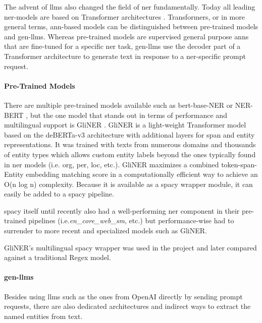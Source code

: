The advent of \glspl{llm} also changed the field of \gls{ner} fundamentally.
Today all leading \gls{ner}-models are based on \gls{Transformer} architectures \cite{leaderboard-ner}.
\glspl{Transformer}, or in more general terms, \gls{ann}-based models can be distinguished between pre-trained models and \glspl{gen-llm}.
Whereas pre-trained models are supervised general purpose \glspl{ann} that are fine-tuned for a specific \gls{ner} task,
\glspl{gen-llm} use the decoder part of a \gls{Transformer} architecture to generate text in response to a \gls{ner}-specific \gls{prompt} request.

\paragraph{Pre-Trained Models}
There are multiple pre-trained models available such as bert-base-NER \cite{bertbaseNER} or NER-BERT \cite{nerbert}, but the one model that stands out in terms of performance and multilingual support is GliNER \cite{gliner}.
GliNER is a light-weight \gls{Transformer} model based on the deBERTa-v3 \cite{deberta} architecture with additional layers for \gls{span} and entity representations.
It was trained with texts from numerous domains and thousands of entity types \cite{gliner} which allows custom entity labels beyond the ones typically found in \gls{ner} models (i.e. \gls{org}, \gls{per}, \gls{loc}, etc.).
GliNER maximizes a combined \gls{token}-\gls{span}-Entity embedding matching score in a computationally efficient way to achieve an O(n log n) complexity.
Because it is available as a spacy wrapper module, it can easily be added to a spacy pipeline.

spacy itself until recently also had a well-performing \gls{ner} component in their pre-trained pipelines (i.e.\emph{en\_core\_web\_sm}, etc.) but performance-wise had to surrender to more recent and specialized models such as GliNER.

GliNER’s multilingual spacy wrapper was used in the project and later compared against a traditional \gls{Regex} model.

\paragraph{\glspl{gen-llm}}\label{par:gpt-ner}
Besides using \glspl{llm} such as the ones from OpenAI directly by sending \gls{prompt} requests, there are also dedicated architectures and indirect ways to extract the named entities from text.


